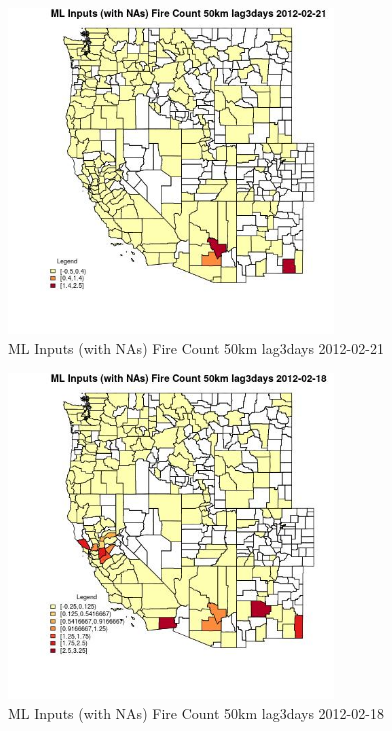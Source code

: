 \begin{figure} 
\centering  
\includegraphics[width=0.77\textwidth]{Code_Outputs/Report_ML_input_PM25_Step4_part_f_de_duplicated_aves_prioritize_24hr_obswNAs_CountyFire_Count_50km_lag3daysMean2012-02-21.jpg} 
\caption{\label{fig:Report_ML_input_PM25_Step4_part_f_de_duplicated_aves_prioritize_24hr_obswNAsCountyFire_Count_50km_lag3daysMean2012-02-21}ML Inputs (with NAs) Fire Count 50km lag3days 2012-02-21} 
\end{figure} 
 

\clearpage 

\begin{figure} 
\centering  
\includegraphics[width=0.77\textwidth]{Code_Outputs/Report_ML_input_PM25_Step4_part_f_de_duplicated_aves_prioritize_24hr_obswNAs_CountyFire_Count_50km_lag3daysMean2012-02-18.jpg} 
\caption{\label{fig:Report_ML_input_PM25_Step4_part_f_de_duplicated_aves_prioritize_24hr_obswNAsCountyFire_Count_50km_lag3daysMean2012-02-18}ML Inputs (with NAs) Fire Count 50km lag3days 2012-02-18} 
\end{figure} 
 

